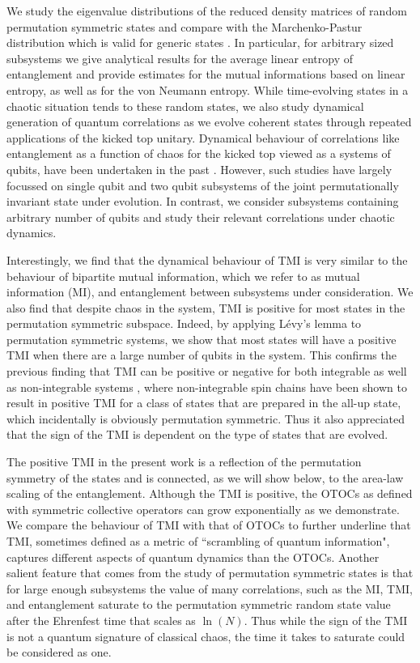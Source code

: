 \documentclass[pre,aps,showpacs,showkeys,twocolumn]{revtex4-1}
\theoremstyle{definition}
\theoremstyle{remark}
\begin{document}
We study the eigenvalue distributions of the reduced density matrices of random permutation symmetric states and compare with the Marchenko-Pastur distribution which is valid for generic states \cite{marvcenko1967distribution}. In particular, for arbitrary sized subsystems we give analytical results for the average linear entropy of entanglement and provide estimates for the mutual informations based on linear entropy, as well as for the von Neumann entropy. While time-evolving states in a chaotic situation tends to these random states, we also study dynamical generation of quantum correlations as we evolve coherent states through repeated applications of the kicked top unitary. Dynamical behaviour of correlations like entanglement as a function of chaos for the kicked top viewed as a systems of qubits, have been undertaken in the past \cite{Ghose, Wang2004, madhok2015signatures, Madhok2018_corr}. However, such studies have largely focussed on single qubit and two qubit subsystems of the joint permutationally invariant state under evolution. In contrast, we consider subsystems containing arbitrary number of qubits and study their relevant correlations under chaotic dynamics.

Interestingly, we find that the dynamical behaviour of TMI is very similar to the behaviour of bipartite mutual information, which we refer to as mutual information (MI), and entanglement between subsystems under consideration. We also find that despite chaos in the system, TMI is positive for most states in the permutation symmetric subspace. Indeed, by applying L{\'e}vy's lemma to permutation symmetric systems, we show that most states will have a positive TMI when there are a large number of qubits in the system. This confirms the previous finding that TMI can be positive or negative for both integrable as well as non-integrable systems \cite{IyodaSagawa}, where non-integrable spin chains have been shown to result in positive TMI for a class of states that are prepared in the all-up state, which incidentally is obviously permutation symmetric. Thus it also appreciated that the sign of the TMI is dependent on the type of states that are evolved.

The positive TMI in the present work is a reflection of the permutation symmetry of the states and is connected, as we will show below, to the area-law scaling of the entanglement. Although the TMI is positive, the OTOCs as defined with symmetric collective operators can grow exponentially as we demonstrate. We compare the behaviour of TMI with that of OTOCs to further underline that TMI, sometimes defined as a metric of ``scrambling of quantum information", captures different aspects of quantum dynamics than the OTOCs. Another salient feature that comes from the study of permutation symmetric states is that for large enough subsystems the value of many correlations, such as the MI, TMI, and entanglement saturate to the permutation symmetric random state value after the Ehrenfest time that scales as $\ln(N)$. Thus while the sign of the TMI is not a quantum signature of classical chaos, the time it takes to saturate could be considered as one.
\end{document}
